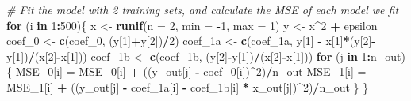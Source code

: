 \documentclass[]{article}
\newenvironment{Shaded}{\begin{snugshade}}{\end{snugshade}}
\newcommand{\KeywordTok}[1]{\textcolor[rgb]{0.13,0.29,0.53}{\textbf{#1}}}
\newcommand{\DataTypeTok}[1]{\textcolor[rgb]{0.13,0.29,0.53}{#1}}
\newcommand{\DecValTok}[1]{\textcolor[rgb]{0.00,0.00,0.81}{#1}}
\newcommand{\StringTok}[1]{\textcolor[rgb]{0.31,0.60,0.02}{#1}}
\newcommand{\CommentTok}[1]{\textcolor[rgb]{0.56,0.35,0.01}{\textit{#1}}}
\newcommand{\ControlFlowTok}[1]{\textcolor[rgb]{0.13,0.29,0.53}{\textbf{#1}}}
\newcommand{\OperatorTok}[1]{\textcolor[rgb]{0.81,0.36,0.00}{\textbf{#1}}}
\newcommand{\NormalTok}[1]{#1}
\begin{document}
\begin{Shaded}
\begin{Highlighting}[]
\CommentTok{# Fit the model with 2 training sets, and calculate the MSE of each model we fit}
\ControlFlowTok{for}\NormalTok{ (i }\ControlFlowTok{in} \DecValTok{1}\OperatorTok{:}\DecValTok{500}\NormalTok{)\{}
\NormalTok{  x <-}\StringTok{ }\KeywordTok{runif}\NormalTok{(}\DataTypeTok{n =} \DecValTok{2}\NormalTok{, }\DataTypeTok{min =} \OperatorTok{-}\DecValTok{1}\NormalTok{, }\DataTypeTok{max =} \DecValTok{1}\NormalTok{)}
\NormalTok{  y <-}\StringTok{ }\NormalTok{x}\OperatorTok{^}\DecValTok{2} \OperatorTok{+}\StringTok{ }\NormalTok{epsilon}
\NormalTok{  coef_}\DecValTok{0}\NormalTok{ <-}\StringTok{ }\KeywordTok{c}\NormalTok{(coef_}\DecValTok{0}\NormalTok{, (y[}\DecValTok{1}\NormalTok{]}\OperatorTok{+}\NormalTok{y[}\DecValTok{2}\NormalTok{])}\OperatorTok{/}\DecValTok{2}\NormalTok{)}
\NormalTok{  coef_1a <-}\StringTok{ }\KeywordTok{c}\NormalTok{(coef_1a, y[}\DecValTok{1}\NormalTok{] }\OperatorTok{-}\StringTok{ }\NormalTok{x[}\DecValTok{1}\NormalTok{]}\OperatorTok{*}\NormalTok{(y[}\DecValTok{2}\NormalTok{]}\OperatorTok{-}\NormalTok{y[}\DecValTok{1}\NormalTok{])}\OperatorTok{/}\NormalTok{(x[}\DecValTok{2}\NormalTok{]}\OperatorTok{-}\NormalTok{x[}\DecValTok{1}\NormalTok{]))}
\NormalTok{  coef_1b <-}\StringTok{ }\KeywordTok{c}\NormalTok{(coef_1b, (y[}\DecValTok{2}\NormalTok{]}\OperatorTok{-}\NormalTok{y[}\DecValTok{1}\NormalTok{])}\OperatorTok{/}\NormalTok{(x[}\DecValTok{2}\NormalTok{]}\OperatorTok{-}\NormalTok{x[}\DecValTok{1}\NormalTok{]))}
  \ControlFlowTok{for}\NormalTok{ (j }\ControlFlowTok{in} \DecValTok{1}\OperatorTok{:}\NormalTok{n_out)\{}
\NormalTok{    MSE_}\DecValTok{0}\NormalTok{[i] =}\StringTok{ }\NormalTok{MSE_}\DecValTok{0}\NormalTok{[i] }\OperatorTok{+}\StringTok{ }\NormalTok{((y_out[j] }\OperatorTok{-}\StringTok{ }\NormalTok{coef_}\DecValTok{0}\NormalTok{[i])}\OperatorTok{^}\DecValTok{2}\NormalTok{)}\OperatorTok{/}\NormalTok{n_out}
\NormalTok{    MSE_}\DecValTok{1}\NormalTok{[i] =}\StringTok{ }\NormalTok{MSE_}\DecValTok{1}\NormalTok{[i] }\OperatorTok{+}\StringTok{ }\NormalTok{((y_out[j] }\OperatorTok{-}\StringTok{ }\NormalTok{coef_1a[i] }\OperatorTok{-}\StringTok{ }\NormalTok{coef_1b[i] }\OperatorTok{*}\StringTok{ }\NormalTok{x_out[j])}\OperatorTok{^}\DecValTok{2}\NormalTok{)}\OperatorTok{/}\NormalTok{n_out}
\NormalTok{  \}}
\NormalTok{\}}
\end{Highlighting}
\end{Shaded}
\end{document}
